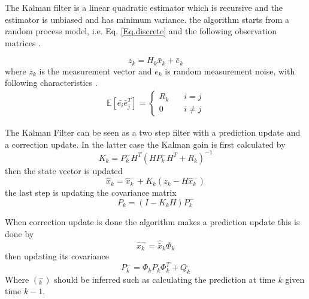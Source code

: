 The Kalman filter is a linear quadratic estimator which is recursive and the estimator is unbiased and has minimum variance. the algorithm starts from a random process model, i.e. Eq. \eqref{Eq.discrete} and the following observation matrices \cite{Discrete_kalman}.

\begin{equation}
z_k = H_k\bar{x}_k + \bar{e}_k
\end{equation}
where $z_k$ is the measurement vector and $e_k$ is random measurement noise, with following characteristics \cite{signal_process}.
\begin{align}
\mathbb{E}[\bar{e_i}\bar{e}_j^T] =
\begin{cases}
  R_k &\quad i=j\\    
  0 &\quad i\neq j   
\end{cases}
\end{align}

The Kalman Filter can be seen as a two step filter with a prediction update and a correction update. In the latter case the Kalman gain is first calculated by
\begin{equation}
K_k = P_k^-H^T(HP_k^-H^T+R_k)^{-1}
\end{equation}
then the state vector is updated
\begin{equation}
\hat{x}_k = \hat{x}_k^- + K_k(z_k-H\hat{x}_k^-)
\end{equation}
the last step is updating the covariance matrix
\begin{equation}
P_k = (I-K_kH)P_k^-
\end{equation}

When correction update is done the algorithm makes a prediction update this is done by 
\begin{equation}
\hat{x}_k^- = \hat{\bar{x}}_k\Phi_k
\end{equation}
then updating its covariance
\begin{equation}
P_k^- = \Phi_k P_k \Phi_k^T + Q_k^.
\end{equation}
Where $(_k^-)$ should be inferred such as calculating the prediction at time $k$ given time $k-1$.\\

